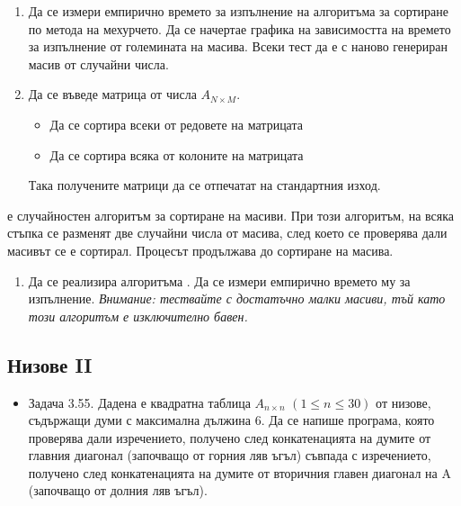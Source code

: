 {\begin{enumerate}[resume]

  \item Да се измери емпирично времето за изпълнение на алгоритъма за сортиране по метода на мехурчето. Да се начертае графика на зависимостта на времето за изпълнение от големината на масива. Всеки тест да е с наново генериран масив от случайни числа.
  \item Да се въведе матрица от числа $A_{N \times M}$.
  \begin{itemize}
      \item Да се сортира всеки от редовете на матрицата
      \item Да се сортира всяка от колоните на матрицата
  \end{itemize}
  Така получените матрици да се отпечатат на стандартния изход.

\end{enumerate}



\begin{mdframed}[hidealllines=true,backgroundcolor=gray!20]
 е случайностен алгоритъм за сортиране на масиви. При този алгоритъм, на всяка стъпка се разменят две случайни числа от масива, след което се проверява дали масивът се е сортирал. Процесът продължава до сортиране на масива.
\end{mdframed}

\begin{enumerate}[resume]

  \item Да се реализира алгоритъма . Да се измери емпирично времето му за изпълнение. \emph{Внимание: тествайте с достатъчно малки масиви, тъй като този алгоритъм е изключително бавен.}

\end{enumerate}

\subsection {Низове II}

\begin{itemize}[resume]

  \item Задача 3.55. \cite{sbornik} Дадена е квадратна таблица $A_{n\times n}$ $(1 \le n \le 30)$ от низове, съдържащи думи с максимална дължина 6. Да се напише програма, която проверява дали изречението, получено след конкатенацията на думите от главния диагонал (започващо от горния ляв ъгъл) съвпада с изречението, получено след конкатенацията на думите от вторичния главен диагонал на A (започващо от долния ляв ъгъл).


\end{itemize}}

